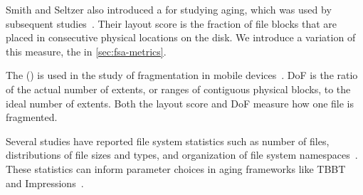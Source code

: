 Smith and Seltzer also introduced a  for studying aging,
which was used by subsequent
studies~\cite{DBLP:conf/mascots/AhnKCP02,DBLP:journals/tos/AgrawalAA09}. Their
layout score is the fraction of file blocks that are placed in consecutive
physical locations on the disk. We introduce a variation of this measure, the
 in \cref{sec:fsa-metrics}.


The  () is used in the study of
fragmentation in mobile devices~\cite{DBLP:conf/hotstorage/JiCSWLX16}. DoF is
the ratio of the actual number of extents, or ranges of contiguous physical
blocks, to the ideal number of extents.  Both the layout score and DoF measure
how one file is fragmented.

Several studies have reported file system statistics
such as number of files, distributions of
file sizes and types, and organization of file system
namespaces~\cite{DBLP:journals/tos/AgrawalBDL07,DBLP:conf/mascots/Downey01,DBLP:conf/usenix/RoselliLA00}.
These statistics can inform parameter choices in aging frameworks like TBBT and Impressions~\cite{DBLP:conf/fast/ZhuCC05,DBLP:journals/tos/AgrawalAA09}.



